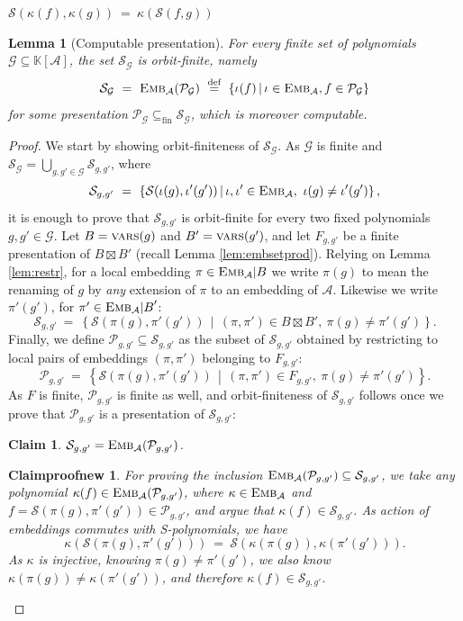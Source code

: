 \documentclass[10pt,a4paper]{amsart}
\newtheorem{lemma}{Lemma}
\newtheorem{claim}{Claim}
\newtheorem{claimproofnew}{Claimproofnew}
\newcommand{\E}{{\embed{\WW}}}
\newcommand{\G}{\mathcal{G}}
\newcommand{\Pres}[1]{\mathcal{P}_{#1}}
\newcommand{\R}{\mathbb{K}}
\newcommand{\Sof}[1]{\mathcal{S}(#1)}
\newcommand{\Ssub}[1]{\mathcal{S}_{#1}}
\newcommand{\UU}{\mathcal{C}}
\newcommand{\VV}{\mathcal{B}}
\newcommand{\Vs}{B}
\newcommand{\WW}{\mathcal{A}}
\newcommand{\defeq}{\stackrel{\text{\tiny def}}{=}}
\newcommand{\embed}[1]{\text{\sc Emb}_{#1}}
\newcommand{\embset}[1]{\restr \E #1}
\newcommand{\embsetprod}[2]{#1\boxtimes #2}
\newcommand{\polyring}[2]{#1[#2]}
\newcommand{\restr}[2]{{#1}{|#2}}
\newcommand{\set}[1]{\left\{#1\right\}}
\newcommand{\setof}[2]{\left\{#1 \, \middle\vert \, #2\right\}}
\newcommand{\subseteqfin}{\subseteq_\text{fin}}
\newcommand{\vars}[1]{\text{\sc vars}(#1)}
\begin{document}
$\Sof {\kappa(f), \kappa(g)} \ = \ \kappa(\Sof {f,g})$

\begin{lemma}[Computable presentation] \label{lem:min finite}
For every finite set of polynomials $\G \subseteq \polyring{\R}{\WW}$, the set $\Ssub\G$ 
is orbit-finite, namely
\[
\Ssub\G \ = \ \E(\Pres\G) \ \defeq \ \setof{\iota(f)}{\iota\in\E, f\in\Pres\G}
\]
for some presentation $\Pres\G \subseteqfin \Ssub\G$, which is moreover computable.
\end{lemma}

\begin{proof}
We start by showing orbit-finiteness of $\Ssub\G$.
As $\G$ is finite and $\Ssub \G = \bigcup_{g,g'\in\G} \Ssub {g,g'}$, where
\[
\Ssub {g,g'} \ = \  \setof{\Sof{\iota(g),\iota'(g')}}{\iota, \iota' \in \E, \ \iota(g)\neq\iota'(g')},
\]
it is enough to prove that $\Ssub {g,g'}$ is orbit-finite for every two fixed polynomials $g,g'\in\G$.
Let $\Vs = \vars g$ and $\Vs' = \vars {g'}$, and
let $F_{g,g'}$ be a finite presentation of $\embsetprod {\Vs} {\Vs'}$
(recall Lemma \ref{lem:embsetprod}).
Relying on Lemma \ref{lem:restr},
for a local embedding $\pi\in\embset\Vs$ we write $\pi(g)$ to mean the renaming of $g$
by \emph{any} extension of $\pi$ to an embedding of $\WW$.
Likewise we write $\pi'(g')$, for $\pi'\in\embset{\Vs'}$:
\[
\Ssub {g,g'} \ = \  \setof{\Sof{\pi(g),\pi'(g')}}{(\pi, \pi') \in \embsetprod \Vs {\Vs'}, \ \pi(g)\neq\pi'(g')}.
\]
Finally, we define $\Pres{g,g'}\subseteq \Ssub {g,g'}$ as the subset of $\Ssub {g,g'}$ obtained by restricting 
to local pairs of embeddings $(\pi, \pi')$ belonging to $F_{g,g'}$:
\[
\Pres{g,g'} \ = \ \setof{\Sof {\pi(g), \pi'(g')}}{(\pi,\pi') \in F_{g,g'}, \ \pi(g)\neq\pi'(g')}.
\]
As $F$ is finite, $\Pres{g,g'}$ is finite as well, 
and orbit-finiteness of $\Ssub {g,g'}$ follows once we prove that
$\Pres{g,g'}$ is a presentation of $\Ssub{g,g'}$:
%
\begin{claim}
$\Ssub {g,g'} = \E(\Pres{g,g'})$.
\end{claim}
\begin{claimproofnew}
For proving the inclusion
$\E(\Pres{g,g'}) \subseteq \Ssub {g,g'}$,
we take any polynomial $\kappa(f)\in \E(\Pres{g,g'})$, where $\kappa \in \E$ and $f = \Sof {\pi(g), \pi'(g')} \in \Pres{g,g'}$,
and argue that $\kappa(f) \in \Ssub {g,g'}$.
As action of embeddings commutes with S-polynomials, 
we have
\[
\kappa(\Sof {\pi(g), \pi'(g')}) \ = \ \Sof {\kappa(\pi(g)), \kappa(\pi'(g'))}.
\]
As $\kappa$ is injective, 
knowing $\pi(g)\neq\pi'(g')$, we also know $\kappa(\pi(g))\neq\kappa(\pi'(g'))$,
and therefore $\kappa(f) \in \Ssub {g,g'}$.


\end{claimproofnew}
\end{proof}
\end{document}
